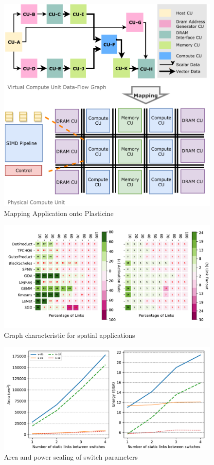 \documentclass[portrait,a0,final]{a0poster}
\begin{document}
\begin{multicols}{3}
\begin{figure}[H]
\caption{Mapping Application onto Plasticine}
\label{fig:mapping}
\centering
\includegraphics[width=1\linewidth]{figs/mapping.pdf}
\end{figure}

\begin{figure}[H]
\caption{Graph characteristic for spatial applications}
\label{fig:link}
\centering
\includegraphics[width=1\linewidth]{figs/link5.pdf}
\end{figure}

\begin{figure}[H]
\caption{Area and power scaling of switch parameters}
\label{fig:switch}
\centering
\includegraphics[width=1\linewidth]{figs/switch.pdf}
\end{figure}


\end{multicols}
\end{document}
